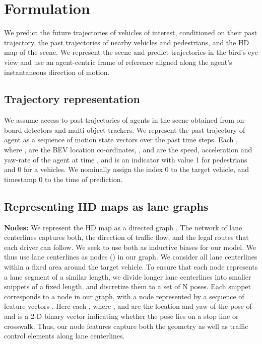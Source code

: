 \documentclass{article}
\begin{document}
\vspace{-2mm}
\section{Formulation}
\vspace{-2mm}
\label{sec:formulation}
We predict the future trajectories of vehicles of interest, conditioned on their past trajectory, the past trajectories of nearby vehicles and pedestrians, and the HD map of the scene.
We represent the scene and predict trajectories in the bird's eye view and use an agent-centric frame of reference aligned along the agent's instantaneous direction of motion.

\vspace{-2mm}
\subsection{Trajectory representation}
We assume access to past trajectories of agents in the scene obtained from on-board detectors and multi-object trackers. We represent the past trajectory of agent  as a sequence of motion state vectors  over the past  time steps. Each
, where ,  are the BEV location co-ordinates, ,  and  are the speed, acceleration and yaw-rate of the agent at time , and  is an indicator with value 1 for pedestrians and 0 for a vehicles. We nominally assign the index 0 to the target vehicle, and timestamp 0 to the time of prediction.

\vspace{-2mm}
\subsection{Representing HD maps as lane graphs}
\label{sec:lane_graphs}
 


 \textbf{Nodes:} We represent the HD map as a directed graph . The network of lane centerlines captures both, the direction of traffic flow, and the legal routes that each driver can follow. We seek to use both as inductive biases for our model. We thus use lane centerlines as nodes () in our graph. We consider all lane centerlines within a fixed area around the target vehicle. To ensure that each node represents a lane segment of a similar length, we divide longer lane centerlines into smaller snippets of a fixed length, and discretize them to a set of N poses. Each snippet corresponds to a node in our graph, with a node  represented by a sequence of feature vectors . Here each , where ,  and  are the location and yaw of the  pose of  and  is a 2-D binary vector indicating whether the pose lies on a stop line or crosswalk. Thus, our node features capture both the geometry as well as traffic control elements along lane centerlines. 
\end{document}

